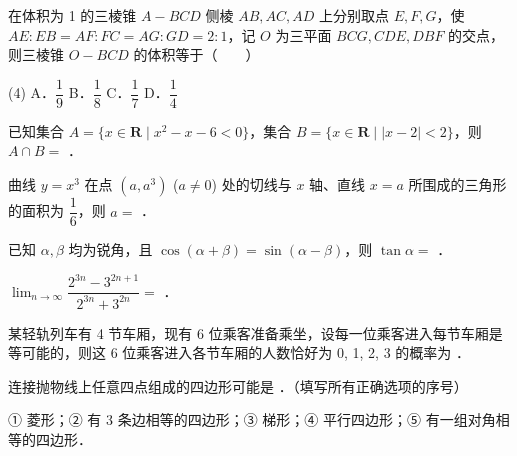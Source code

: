\begin{question}
在体积为 1 的三棱锥 $A - BCD$ 侧棱 $AB, AC, AD$ 上分别取点 $E, F, G$，使 $AE:EB = AF:FC = AG:GD = 2:1$，记 $O$ 为三平面 $BCG, CDE, DBF$ 的交点，则三棱锥 $O - BCD$ 的体积等于\mbox{（　　）}

\begin{gkopts}(4)
\task A．$\dfrac{1}{9}$
\task B．$\dfrac{1}{8}$
\task C．$\dfrac{1}{7}$
\task D．$\dfrac{1}{4}$
\end{gkopts}

\end{question}

\begin{question}
已知集合 $A = \{x \in \mathbf{R} \mid x^2 - x - 6 < 0\}$，集合 $B = \{x \in \mathbf{R} \mid |x - 2| < 2\}$，则 $A \cap B =$ \gkblank{}．

\end{question}
\begin{question}
曲线 $y = x^3$ 在点 $(a, a^3)$ ($a \neq 0$) 处的切线与 $x$ 轴、直线 $x = a$ 所围成的三角形的面积为 $\dfrac{1}{6}$，则 $a =$ \gkblank{}．

\end{question}
\begin{question}
已知 $\alpha, \beta$ 均为锐角，且 $\cos(\alpha + \beta) = \sin(\alpha - \beta)$，则 $\tan\alpha =$ \gkblank{}．

\end{question}
\begin{question}
$\lim_{n \to \infty} \dfrac{2^{3n} - 3^{2n+1}}{2^{3n} + 3^{2n}} =$ \gkblank{}．

\end{question}
\begin{question}
某轻轨列车有 4 节车厢，现有 6 位乘客准备乘坐，设每一位乘客进入每节车厢是等可能的，则这 6 位乘客进入各节车厢的人数恰好为 0, 1, 2, 3 的概率为 \gkblank{}．

\end{question}
\begin{question}
连接抛物线上任意四点组成的四边形可能是 \gkblank{}．（填写所有正确选项的序号）

① 菱形；② 有 3 条边相等的四边形；③ 梯形；④ 平行四边形；⑤ 有一组对角相等的四边形．

\end{question}

